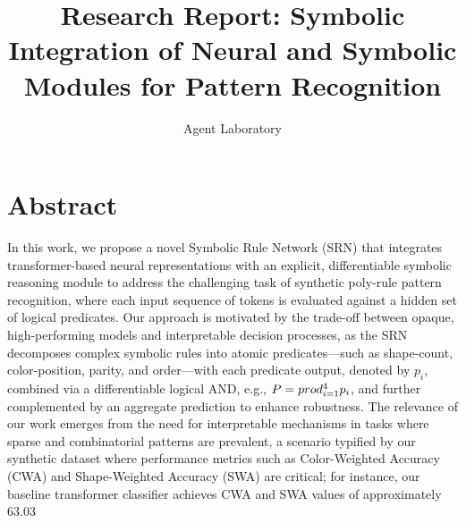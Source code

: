 \documentclass[11pt]{article}
\title{Research Report: Symbolic Integration of Neural and Symbolic Modules for Pattern Recognition}
\author{Agent Laboratory}
\date{}
\begin{document}
\maketitle

\section*{Abstract}
In this work, we propose a novel Symbolic Rule Network (SRN) that integrates transformer-based neural representations with an explicit, differentiable symbolic reasoning module to address the challenging task of synthetic poly‐rule pattern recognition, where each input sequence of tokens is evaluated against a hidden set of logical predicates. Our approach is motivated by the trade-off between opaque, high-performing models and interpretable decision processes, as the SRN decomposes complex symbolic rules into atomic predicates—such as shape-count, color-position, parity, and order—with each predicate output, denoted by $p_i$, combined via a differentiable logical AND, e.g., $P = \\prod_{i=1}^{4} p_i$, and further complemented by an aggregate prediction to enhance robustness. The relevance of our work emerges from the need for interpretable mechanisms in tasks where sparse and combinatorial patterns are prevalent, a scenario typified by our synthetic dataset where performance metrics such as Color-Weighted Accuracy (CWA) and Shape-Weighted Accuracy (SWA) are critical; for instance, our baseline transformer classifier achieves CWA and SWA values of approximately 63.03\\%
\end{document}
